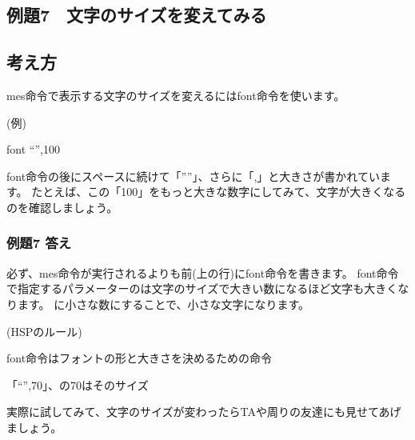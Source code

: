 \documentclass[text02.tex]{subfiles}
\begin{document}
\clearpage

\subsection{例題7　文字のサイズを変えてみる}

\subsection*{考え方}

mes命令で表示する文字のサイズを変えるにはfont命令を使います。

\begin{description}
    \item (例)
    \item font “”,100
\end{description}

font命令の後にスペースに続けて「””」、さらに「,」と大きさが書かれています。
たとえば、この「100」をもっと大きな数字にしてみて、文字が大きくなるのを確認しましょう。

\subsubsection*{例題7 答え}

必ず、mes命令が実行されるよりも前(上の行)にfont命令を書きます。
font命令で指定するパラメーターのは文字のサイズで大きい数になるほど文字も大きくなります。
に小さな数にすることで、小さな文字になります。

\begin{description}
    \item (HSPのルール)
\end{description}

\begin{description}
    \item font命令はフォントの形と大きさを決めるための命令
    \item 「“”,70」、の70はそのサイズ
\end{description}

実際に試してみて、文字のサイズが変わったらTAや周りの友達にも見せてあげましょう。
\end{document}
